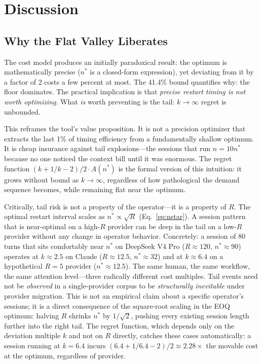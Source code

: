 \documentclass[11pt]{article}
\theoremstyle{definition}
\theoremstyle{remark}
\begin{document}
\section{Discussion}

\subsection{Why the Flat Valley Liberates}

The cost model produces an initially paradoxical result: the optimum is mathematically precise ($n^*$ is a closed-form expression), yet deviating from it by a factor of 2 costs a few percent at most. The 41.4\% bound quantifies why: the floor dominates. The practical implication is that \emph{precise restart timing is not worth optimizing}. What \emph{is} worth preventing is the tail: $k \to \infty$ regret is unbounded.

This reframes the tool's value proposition. It is not a precision optimizer that extracts the last 1\% of timing efficiency from a fundamentally shallow optimum. It is cheap insurance against tail explosions---the sessions that run $n = 10n^*$ because no one noticed the context bill until it was enormous. The regret function $(k + 1/k - 2)/2 \cdot A(n^*)$ is the formal version of this intuition: it grows without bound as $k \to \infty$, regardless of how pathological the demand sequence becomes, while remaining flat near the optimum.

Critically, tail risk is not a property of the operator---it is a property of $R$. The optimal restart interval scales as $n^* \propto \sqrt{R}$ (Eq.~\ref{eq:nstar}). A session pattern that is near-optimal on a high-$R$ provider can be deep in the tail on a low-$R$ provider without any change in operator behavior. Concretely: a session of 80 turns that sits comfortably near $n^*$ on DeepSeek V4 Pro ($R \approx 120$, $n^* \approx 90$) operates at $k \approx 2.5$ on Claude ($R \approx 12.5$, $n^* \approx 32$) and at $k \approx 6.4$ on a hypothetical $R=5$ provider ($n^* \approx 12.5$). The same human, the same workflow, the same attention level---three radically different cost multiples. Tail events need not be \emph{observed} in a single-provider corpus to be \emph{structurally inevitable} under provider migration. This is not an empirical claim about a specific operator's sessions; it is a direct consequence of the square-root scaling in the EOQ optimum: halving $R$ shrinks $n^*$ by $1/\sqrt{2}$, pushing every existing session length further into the right tail. The regret function, which depends only on the deviation multiple $k$ and not on $R$ directly, catches these cases automatically: a session running at $k=6.4$ incurs $(6.4 + 1/6.4 - 2)/2 \approx 2.28\times$ the movable cost at the optimum, regardless of provider.
\end{document}
